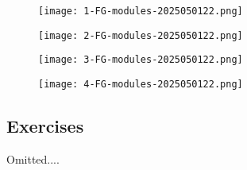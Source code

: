\begin{figure}[H]
\centering
\texttt{[image: 1-FG-modules-2025050122.png]}
\label{}
\end{figure}
\begin{figure}[H]
\centering
\texttt{[image: 2-FG-modules-2025050122.png]}
\label{}
\end{figure}
\begin{figure}[H]
\centering
\texttt{[image: 3-FG-modules-2025050122.png]}
\label{}
\end{figure}

\begin{figure}[H]
\centering
\texttt{[image: 4-FG-modules-2025050122.png]}
\label{}
\end{figure}

\subsection{Exercises}

Omitted....
